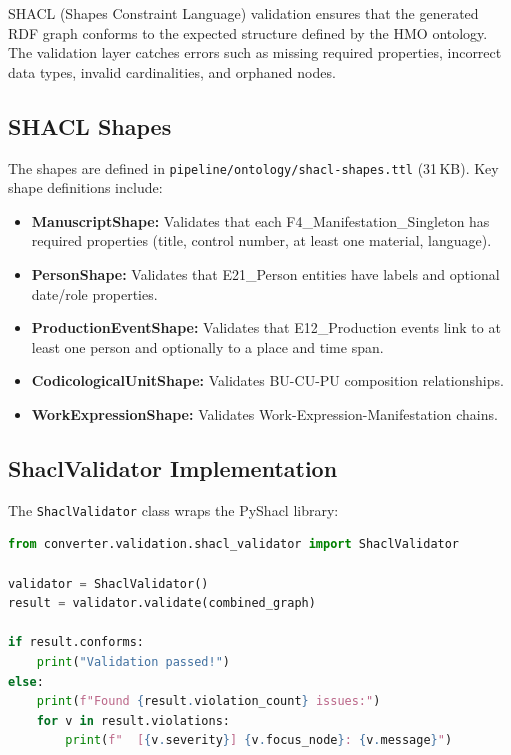 \documentclass[12pt]{article}
\newcommand{\filepath}[1]{\texttt{\small #1}}
\newcommand{\code}[1]{\texttt{#1}}
\begin{document}
SHACL (Shapes Constraint Language) validation ensures that the generated RDF graph conforms to the expected structure defined by the HMO ontology. The validation layer catches errors such as missing required properties, incorrect data types, invalid cardinalities, and orphaned nodes.

\subsection{SHACL Shapes}

The shapes are defined in \filepath{pipeline/ontology/shacl-shapes.ttl} (31\,KB). Key shape definitions include:

\begin{itemize}
\item \textbf{ManuscriptShape:} Validates that each F4\_Manifestation\_Singleton has required properties (title, control number, at least one material, language).
\item \textbf{PersonShape:} Validates that E21\_Person entities have labels and optional date/role properties.
\item \textbf{ProductionEventShape:} Validates that E12\_Production events link to at least one person and optionally to a place and time span.
\item \textbf{CodicologicalUnitShape:} Validates BU-CU-PU composition relationships.
\item \textbf{WorkExpressionShape:} Validates Work-Expression-Manifestation chains.
\end{itemize}

\subsection{ShaclValidator Implementation}

The \code{ShaclValidator} class wraps the PyShacl library:

\begin{lstlisting}[language=Python, caption={SHACL validation}]
from converter.validation.shacl_validator import ShaclValidator

validator = ShaclValidator()
result = validator.validate(combined_graph)

if result.conforms:
    print("Validation passed!")
else:
    print(f"Found {result.violation_count} issues:")
    for v in result.violations:
        print(f"  [{v.severity}] {v.focus_node}: {v.message}")
\end{lstlisting}
\end{document}
